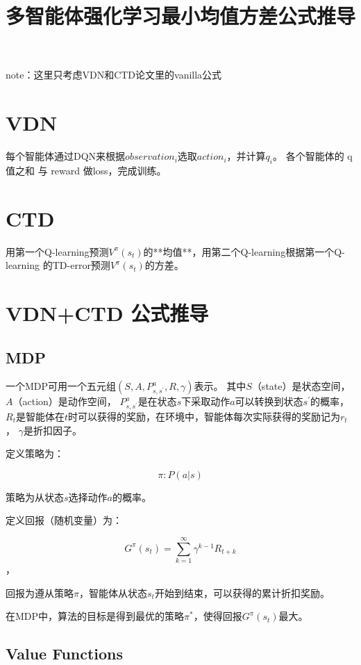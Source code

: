 \documentclass[UTF8]{ctexart}
\title{多智能体强化学习最小均值方差公式推导}
\begin{document}
\maketitle

note：这里只考虑VDN和CTD论文里的vanilla公式

\section{VDN}


每个智能体通过DQN来根据$observation_i$选取$action_i$，并计算$q_i$。
各个智能体的 q值之和 与 reward 做loss，完成训练。

\section{CTD}

用第一个Q-learning预测$V^{\pi}(s_t)$的**均值**，用第二个Q-learning根据第一个Q-learning
的TD-error预测$V^{\pi}(s_t)$的方差。

\section{VDN+CTD 公式推导}

\subsection{MDP}

一个MDP可用一个五元组$(S, A, P^a_{s, s^{\prime}}, R, \gamma)$表示。
其中$S$（state）是状态空间，$A$（action）是动作空间，
$P^a_{s, s^{\prime}}$是在状态$s$下采取动作$a$可以转换到状态$s^{\prime}$的概率，
$R_t$是智能体在$t$时可以获得的奖励，在环境中，智能体每次实际获得的奖励记为$r_t$，
$\gamma$是折扣因子。

定义策略为：

$$\pi:P(a|s)$$

策略为从状态$s$选择动作$a$的概率。

定义回报（随机变量）为：

$$G^{\pi}(s_t) = \sum_{k=1}^{\infty} \gamma^{k-1} R_{t+k}$$，

回报为遵从策略$\pi$，智能体从状态$s_t$开始到结束，可以获得的累计折扣奖励。

在MDP中，算法的目标是得到最优的策略$\pi^*$，使得回报$G^{\pi}(s_t)$最大。

\subsection{Value Functions}
\end{document}
